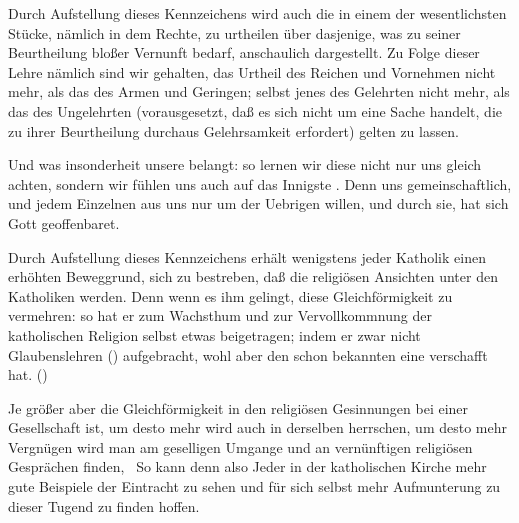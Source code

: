 \begin{aufza}
\item Durch Aufstellung dieses Kennzeichens wird auch die  in einem der wesentlichsten Stücke, nämlich in dem Rechte, zu urtheilen über dasjenige, was zu seiner Beurtheilung bloßer Vernunft bedarf, anschaulich dargestellt. Zu Folge dieser Lehre nämlich sind wir gehalten, das Urtheil des Reichen und Vornehmen nicht mehr, als das des Armen und Geringen; selbst jenes des Gelehrten nicht mehr, als das des Ungelehrten (vorausgesetzt, daß es sich nicht um eine Sache handelt, die zu ihrer Beurtheilung durchaus Gelehrsamkeit erfordert) gelten zu lassen.
\item Und was insonderheit unsere  belangt: so lernen wir diese nicht nur uns gleich achten, sondern wir fühlen uns auch auf das Innigste . Denn uns gemeinschaftlich, und jedem Einzelnen aus uns nur um der Uebrigen willen, und durch sie, hat sich Gott geoffenbaret.
\item Durch Aufstellung dieses Kennzeichens erhält wenigstens jeder  Katholik einen erhöhten Beweggrund, sich zu bestreben, daß die religiösen Ansichten unter den Katholiken  werden. Denn wenn es ihm gelingt, diese Gleichförmigkeit zu vermehren: so hat er zum Wachsthum und zur Vervollkommnung der katholischen Religion selbst etwas beigetragen; indem er zwar nicht  Glaubenslehren () aufgebracht, wohl aber den schon bekannten eine  verschafft hat. ()~
\item Je größer aber die Gleichförmigkeit in den religiösen Gesinnungen bei einer Gesellschaft ist, um desto mehr  wird auch in derselben herrschen, um desto mehr Vergnügen wird man am geselligen Umgange und an vernünftigen religiösen Gesprächen finden, \usw\ So kann denn also Jeder in der katholischen Kirche mehr gute Beispiele der Eintracht zu sehen und für sich selbst mehr Aufmunterung zu dieser Tugend zu finden hoffen.

\end{aufza}
